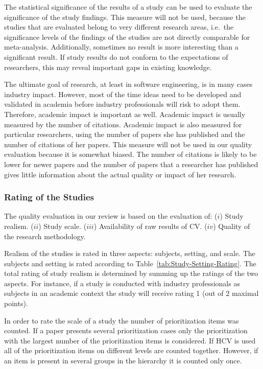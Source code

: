 The statistical significance of the results of a study can be used to evaluate the significance of the study findings.
This measure will not be used, because the studies that are evaluated belong to very different research areas, i.e.\ the significance levels of the findings of the studies are not directly comparable for meta-analysis.
Additionally, sometimes no result is more interesting than a significant result.
If study results do not conform to the expectations of researchers, this may reveal important gaps in existing knowledge.

The ultimate goal of research, at least in software engineering, is in many cases industry impact. However, most of the time ideas need to be developed and validated in academia before industry professionals will risk to adopt them. Therefore, academic impact is important as well. Academic impact is usually measured by the number of citations. Academic impact is also measured for particular researchers, using the number of papers she has published and the number of citations of her papers.
This measure will not be used in our quality evaluation because it is somewhat biased. The number of citations is likely to be lower for newer papers and the number of papers that a researcher has published gives little information about the actual quality or impact of her research.

\subsubsection{Rating of the Studies}
The quality evaluation in our review is based on the evaluation of: ($i$) Study realism. ($ii$) Study scale. ($iii$) Availability of raw results of CV. ($iv$) Quality of the research methodology.

Realism of the studies is rated in three aspects: subjects, setting, and scale.
The subjects and setting is rated according to Table~\ref{tab:Study-Setting-Rating}. The total rating of study realism is determined by summing up the ratings of the two aspects. For instance, if a study is conducted with industry professionals as subjects in an academic context the study will receive rating 1 (out of 2 maximal points). 

In order to rate the scale of a study the number of prioritization items was counted.
If a paper presents several prioritization cases only the prioritization with the largest number of the prioritization items is considered.
If HCV is used all of the prioritization items on different levels are counted together. However, if an item is present in several groups in the hierarchy it is counted only once.

